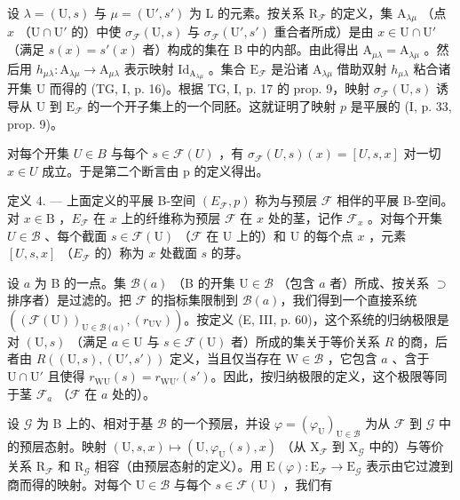 设 \(\lambda = (\mathrm{U}, s)\) 与 \(\mu = (\mathrm{U}', s')\) 为 L 的元素。按关系 \(\mathrm{R}_{\mathcal{F}}\) 的定义，集 \(\mathrm{A}_{\lambda \mu}\) （点 \(x\) （\(\mathrm{U} \cap \mathrm{U}'\) 的）中使 \(\sigma_{\mathcal{F}}(\mathrm{U}, s)\) 与 \(\sigma_{\mathcal{F}}(\mathrm{U}', s')\) 重合者所成）是由 \(x \in \mathrm{U} \cap \mathrm{U}'\) （满足 \(s(x) = s'(x)\) 者）构成的集在 B 中的内部。由此得出 \(\mathrm{A}_{\mu \lambda} = \mathrm{A}_{\lambda \mu}\) 。然后用 \(h_{\mu \lambda} \colon \mathrm{A}_{\lambda \mu} \to \mathrm{A}_{\mu \lambda}\) 表示映射 \(\mathrm{Id}_{\mathrm{A}_{\lambda \mu}}\) 。集合 \(\mathrm{E}_{\mathcal{F}}\) 是沿诸 \(\mathrm{A}_{\lambda \mu}\) 借助双射 \(h_{\mu \lambda}\) 粘合诸开集 U 而得的 (TG, I, p. 16)。根据 TG, I, p. 17 的 prop. 9，映射 \(\sigma_{\mathcal{F}}(\mathrm{U},s)\) 诱导从 U 到 \(\mathrm{E}_{\mathcal{F}}\) 的一个开子集上的一个同胚。这就证明了映射 \(p\) 是平展的 (I, p. 33, prop. 9)。

对每个开集 \(U \in B\) 与每个 \(s \in \mathcal{F}(U)\) ，有 \(\sigma_{\mathcal{F}}(U, s)(x) = [U, s, x]\) 对一切 \(x \in U\) 成立。于是第二个断言由 p 的定义得出。

定义 4. --- 上面定义的平展 B-空间 \((E_{\mathcal{F}},p)\) 称为与预层 \(\mathcal{F}\) 相伴的平展 B-空间。对 \(x \in \mathrm{B}\) ，\(E_{\mathcal{F}}\) 在 \(x\) 上的纤维称为预层 \(\mathcal{F}\) 在 \(x\) 处的茎，记作 \(\mathcal{F}_x\) 。对每个开集 \(U \in \mathcal{B}\) 、每个截面 \(s \in \mathcal{F}(\mathrm{U})\) （\(\mathcal{F}\) 在 U 上的）和 U 的每个点 \(x\) ，元素 \([U,s,x]\) （\(E_{\mathcal{F}}\) 的）称为 \(x\) 处截面 \(s\) 的芽。

设 \(a\) 为 B 的一点。集 \(\mathcal{B}(a)\) （B 的开集 \(\mathrm{U} \in \mathcal{B}\) （包含 \(a\) 者）所成、按关系 \(\supset\) 排序者）是过滤的。把 \(\mathcal{F}\) 的指标集限制到 \(\mathcal{B}(a)\)，我们得到一个直接系统 \(((\mathcal{F}(\mathrm{U}))_{\mathrm{U} \in \mathcal{B}(a)}, (r_{\mathrm{UV}}))\)。按定义 (E, III, p. 60)，这个系统的归纳极限是对 \((\mathrm{U}, s)\) （满足 \(a \in \mathrm{U}\) 与 \(s \in \mathcal{F}(\mathrm{U})\) 者）所成的集关于等价关系 \(R\) 的商，后者由 \(R((\mathrm{U},s),(\mathrm{U}',s'))\) 定义，当且仅当存在 \(\mathrm{W} \in \mathcal{B}\) ，它包含 \(a\) 、含于 \(\mathrm{U} \cap \mathrm{U}'\) 且使得 \(r_{\mathrm{WU}}(s) = r_{\mathrm{WU}'}(s')\)。因此，按归纳极限的定义，这个极限等同于茎 \(\mathcal{F}_a\) （\(\mathcal{F}\) 在 \(a\) 处的）。

设 \(\mathcal{G}\) 为 B 上的、相对于基 \(\mathcal{B}\) 的一个预层，并设 \(\varphi = (\varphi_{\mathrm{U}})_{\mathrm{U} \in \mathcal{B}}\) 为从 \(\mathcal{F}\) 到 \(\mathcal{G}\) 中的预层态射。映射 \((\mathrm{U}, s, x) \mapsto (\mathrm{U}, \varphi_{\mathrm{U}}(s), x)\) （从 \(\mathrm{X}_{\mathcal{F}}\) 到 \(\mathrm{X}_{\mathcal{G}}\) 中的）与等价关系 \(\mathrm{R}_{\mathcal{F}}\) 和 \(\mathrm{R}_{\mathcal{G}}\) 相容（由预层态射的定义）。用 \(\mathrm{E}(\varphi): \mathrm{E}_{\mathcal{F}} \to \mathrm{E}_{\mathcal{G}}\) 表示由它过渡到商而得的映射。对每个 \(\mathrm{U} \in \mathcal{B}\) 与每个 \(s \in \mathcal{F}(\mathrm{U})\) ，我们有

